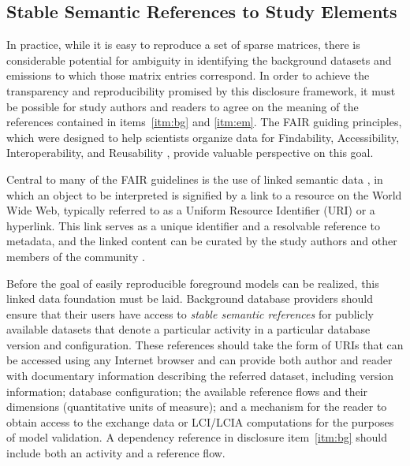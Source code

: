 \subsection{Stable Semantic References to Study Elements}

In practice, while it is easy to reproduce a set of sparse matrices, there is considerable potential for ambiguity in identifying the background datasets and emissions to which those matrix entries correspond.
In order to achieve the transparency and reproducibility promised by this disclosure framework, it must be possible for study authors and readers to agree on the meaning of the references contained in items~\ref{itm:bg} and \ref{itm:em}.
The FAIR guiding principles, which were designed to help scientists organize data for Findability, Accessibility, Interoperability, and Reusability \citep{Wilkinson_2016}, provide valuable perspective on this goal.

Central to many of the FAIR guidelines is the use of linked semantic data \citep{Bizer_2009}, in which an object to be interpreted is signified by a link to a resource on the World Wide Web, typically referred to as a Uniform Resource Identifier (URI) or a hyperlink.  This link serves as a unique identifier and a resolvable reference to metadata, and the linked content can be  curated by the study authors and other members of the community \citep{Khan_2011}.


Before the goal of easily reproducible foreground models can be realized, this linked data foundation must be laid.  Background database providers should ensure that their users have access to \emph{stable semantic references} for publicly available datasets that denote a particular activity in a particular database version and configuration.  These references should take the form of URIs that can be accessed using any Internet browser and can provide both author and reader with documentary information describing the referred dataset, including version information; database configuration; the available reference flows and their dimensions (quantitative units of measure); and a mechanism for the reader to obtain access to the exchange data or LCI/LCIA computations for the purposes of model validation.  A dependency reference in disclosure item~\ref{itm:bg} should include both an activity and a reference flow.


